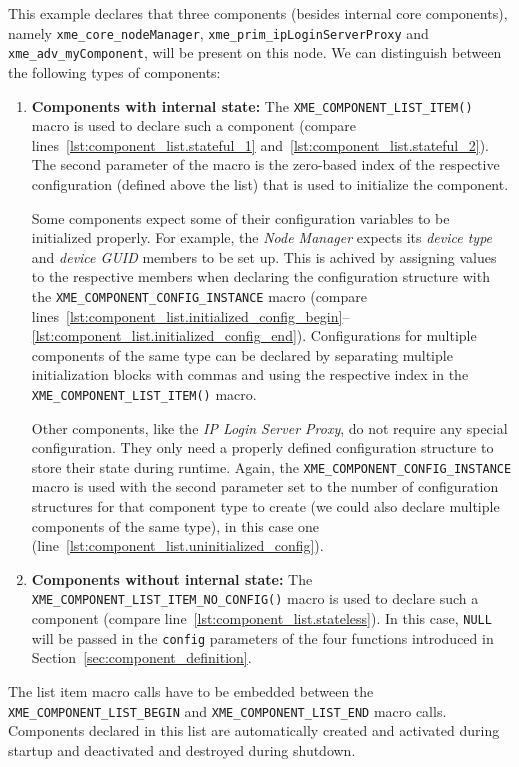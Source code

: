 This example declares that three components (besides internal core components),
namely \verb|xme_core_nodeManager|, \verb|xme_prim_ipLoginServerProxy| and \verb|xme_adv_myComponent|,
will be present on this node.
We can distinguish between the following types of components:
\begin{enumerate}
	\item \textbf{Components with internal state:}
		The \verb|XME_COMPONENT_LIST_ITEM()| macro is used to declare such a component
		(compare lines~\ref{lst:component_list.stateful_1} and~\ref{lst:component_list.stateful_2}).
		The second parameter of the macro is the zero-based index of the respective configuration
		(defined above the list) that is used to initialize the component.
		
		Some components expect some of their configuration variables to be initialized properly.
		For example, the \emph{Node Manager} expects its \emph{device type} and \emph{device GUID}
		members to be set up.
		This is achived by assigning values to the respective members
		when declaring the configuration structure with the \verb|XME_COMPONENT_CONFIG_INSTANCE| macro
		(compare lines~\ref{lst:component_list.initialized_config_begin}--\ref{lst:component_list.initialized_config_end}).
		Configurations for multiple components of the same type can be declared
		by separating multiple initialization blocks with commas and using the respective index in the
		\verb|XME_COMPONENT_LIST_ITEM()| macro.
		
		Other components, like the \emph{IP Login Server Proxy}, do not require any special configuration.
		They only need a properly defined configuration structure to store their state during runtime.
		Again, the \verb|XME_COMPONENT_CONFIG_INSTANCE| macro is used
		with the second parameter set to the number of configuration structures for that component type to create
		(we could also declare multiple components of the same type), in this case one
		(line~\ref{lst:component_list.uninitialized_config}).
	
	\item \textbf{Components without internal state:}
		The \verb|XME_COMPONENT_LIST_ITEM_NO_CONFIG()| macro is used to declare such a component
		(compare line~\ref{lst:component_list.stateless}).
		In this case, \verb|NULL| will be passed in the \verb|config| parameters of the four functions introduced in Section~\ref{sec:component_definition}.
\end{enumerate}

The list item macro calls have to be embedded between the \verb|XME_COMPONENT_LIST_BEGIN| and \verb|XME_COMPONENT_LIST_END| macro calls.
%
Components declared in this list are automatically created and activated during startup
and deactivated and destroyed during shutdown.

